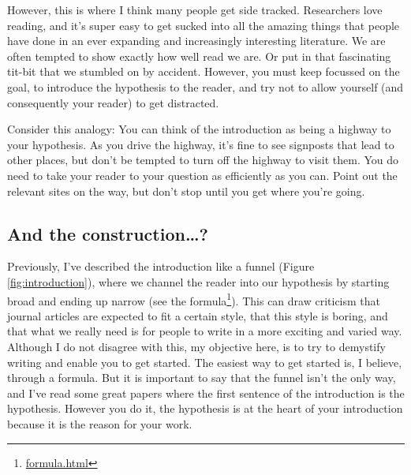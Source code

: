 \documentclass[
]{krantz}
\renewcommand{\href}[2]{#2\footnote{\url{#1}}}
\begin{document}
However, this is where I think many people get side tracked. Researchers love reading, and it's super easy to get sucked into all the amazing things that people have done in an ever expanding and increasingly interesting literature. We are often tempted to show exactly how well read we are. Or put in that fascinating tit-bit that we stumbled on by accident. However, you must keep focussed on the goal, to introduce the hypothesis to the reader, and try not to allow yourself (and consequently your reader) to get distracted.

Consider this analogy: You can think of the introduction as being a highway to your hypothesis. As you drive the highway, it's fine to see signposts that lead to other places, but don't be tempted to turn off the highway to visit them. You do need to take your reader to your question as efficiently as you can. Point out the relevant sites on the way, but don't stop until you get where you're going.

\hypertarget{and-the-construction}{%
\subsection{And the construction\ldots?}\label{and-the-construction}}

Previously, I've described the introduction like a funnel (Figure \ref{fig:introduction}), where we channel the reader into our hypothesis by starting broad and ending up narrow (\href{formula.html}{see the formula}). This can draw criticism that journal articles are expected to fit a certain style, that this style is boring, and that what we really need is for people to write in a more exciting and varied way. Although I do not disagree with this, my objective here, is to try to demystify writing and enable you to get started. The easiest way to get started is, I believe, through a formula. But it is important to say that the funnel isn't the only way, and I've read some great papers where the first sentence of the introduction is the hypothesis. However you do it, the hypothesis is at the heart of your introduction because it is the reason for your work.
\end{document}
